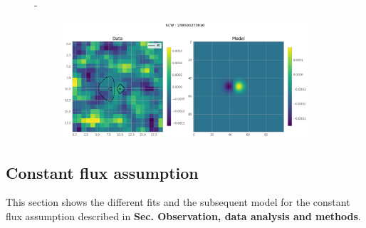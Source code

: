 \documentclass[
	a4paper, %
	10pt, %
	unnumberedsections, %
	twoside, %
]{LTJournalArticle}
\begin{document}
\begin{figure}[H]
\begin{subfigure}{.47\textwidth}
    \end{subfigure}
    \hspace{1em}-
    \begin{subfigure}{.47\textwidth}
        \includegraphics[width=\textwidth]{report/Figures/models/2404/27_psf_notconst.png}
    \end{subfigure}%
    \caption{}
    \label{model_const_24}
    \end{figure}

\subsection{Constant flux assumption}

This section shows the different fits and the subsequent model for the constant flux assumption described in \textbf{Sec. Observation, data analysis and methods}.
\end{document}
